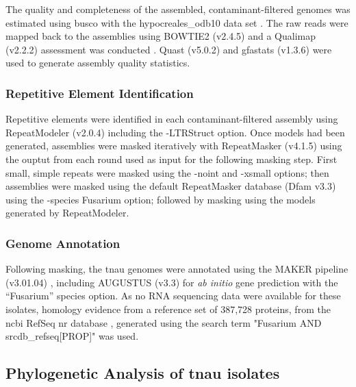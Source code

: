 The quality and completeness of the assembled, contaminant-filtered genomes was estimated using \ac{busco} with the hypocreales\_odb10 data set \parencite{Manni2021}. The raw reads were mapped back to the assemblies using BOWTIE2 (v2.4.5) and a Qualimap (v2.2.2) assessment was conducted \parencite{Garcia-Alcalde2012}. Quast (v5.0.2) \parencite{Gurevich2013}  and gfastats (v1.3.6) \parencite{Formenti2022} were used to generate assembly quality statistics. 

\subsubsection{Repetitive Element Identification}

Repetitive elements were identified in each contaminant-filtered assembly using RepeatModeler (v2.0.4) \parencite{Flynn2020} including the -LTRStruct option. Once models had been generated, assemblies were masked iteratively with RepeatMasker (v4.1.5) \parencite{Smit2010} using the ouptut from each round used as input for the following masking step. First small, simple repeats were masked using the -noint and -xsmall options; then assemblies were masked using the default RepeatMasker database (Dfam v3.3) \parencite{Storer2021} using the -species Fusarium option; followed by masking using the models generated by RepeatModeler.

\subsubsection{Genome Annotation}
Following masking, the \ac{tnau} genomes were annotated using the MAKER pipeline (v3.01.04) \parencite{Holt2011}, including AUGUSTUS (v3.3) \parencite{Stanke2006} for \textit{ab initio} gene prediction with the “Fusarium” species option. As no RNA sequencing data were available for these isolates, homology evidence from a reference set of 387,728 proteins, from the \ac{ncbi} RefSeq nr database \parencite{Agarwala2016}, generated using the search term "Fusarium AND srcdb\_refseq[PROP]" was used. 

\subsection{Phylogenetic Analysis of \ac{tnau} isolates}\label{chap2:phylogeny}

